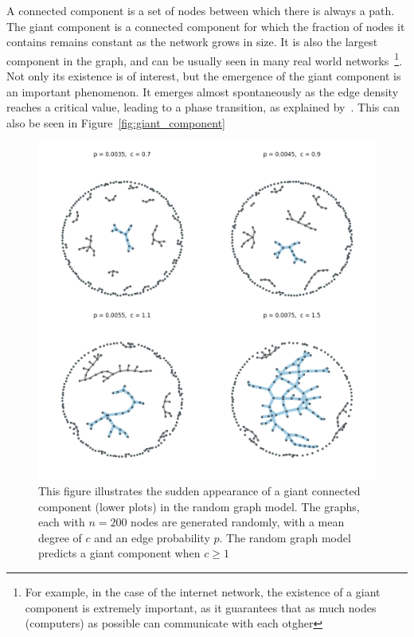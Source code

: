 \documentclass[12pt,beltcrest]{ociamthesis} %
\begin{document}
A connected component is a set of nodes between which there is always a path.
The giant component is a connected component for which the fraction of nodes it contains remains constant as the network grows in size.
It is also the largest component in the graph, and can be usually seen in many real world networks~\footnote{For example, in the case of the internet network, the existence of a giant component is extremely important, as it guarantees that as much nodes (computers) as possible can communicate with each otgher}.
Not only its existence is of interest, but the emergence of the giant component is an important phenomenon.
It emerges almost spontaneously as the edge density reaches a critical value, leading to a phase transition, as explained by~\cite{newman2002random}.
This can also be seen in Figure~\vref{fig:giant_component}
\begin{figure}[tb]
	\centering
	\includegraphics[width=13.5cm]{figures/giant_component.png}
	\caption[Sudden appearance of the giant component in a random graph]{This figure illustrates the sudden appearance of a giant connected component (lower plots) in the random graph model. The graphs, each with $n=200$ nodes are generated randomly, with a mean degree of $c$ and an edge probability $p$. The random graph model predicts a giant component when $c\ge1$}
	\label{fig:giant_component}
\end{figure}
\end{document}
